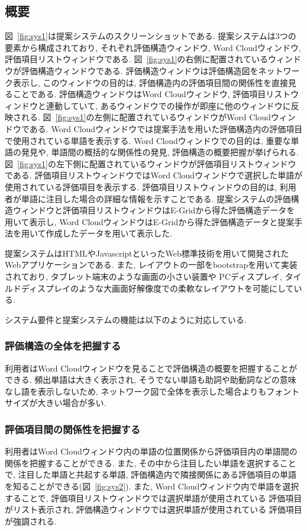 \documentclass[syuuron]{kuee}
\begin{document}
		\subsection{概要}
			図~\ref{fig:sys1}は提案システムのスクリーンショットである. 
			提案システムは3つの要素から構成されており, それぞれ評価構造ウィンドウ, Word Cloudウィンドウ, 評価項目リストウィンドウである. 
			図~\ref{fig:sys1}の右側に配置されているウィンドウが評価構造ウィンドウである. 
			評価構造ウィンドウは評価構造図をネットワーク表示し, このウィンドウの目的は, 評価構造内の評価項目間の関係性を直接見ることである. 
			評価構造ウィンドウはWord Cloudウィンドウ, 評価項目リストウィンドウと連動していて, 
			あるウィンドウでの操作が即座に他のウィンドウに反映される. 
			図~\ref{fig:sys1}の左側に配置されているウィンドウがWord Cloudウィンドウである. 
			Word Cloudウィンドウでは提案手法を用いた評価構造内の評価項目で使用されている単語を表示する. 
			Word Cloudウィンドウでの目的は, 重要な単語の発見や, 単語間の概括的な関係性の発見, 評価構造の概要把握が挙げられる. 
			図~\ref{fig:sys1}の左下側に配置されているウィンドウが評価項目リストウィンドウである. 
			評価項目リストウィンドウではWord Cloudウィンドウで選択した単語が使用されている評価項目を表示する. 
			評価項目リストウィンドウの目的は, 利用者が単語に注目した場合の詳細な情報を示すことである. 
			提案システムの評価構造ウィンドウと評価項目リストウィンドウはE-Gridから得た評価構造データを用いて表示し, 
			Word CloudウィンドウはE-Gridから得た評価構造データと提案手法を用いて作成したデータを用いて表示した. 
			
			提案システムはHTMLやJavascriptといったWeb標準技術を用いて開発されたWebアプリケーションである. 
			また, レイアウトの一部をbootstrapを用いて実装されており, タブレット端末のような画面の小さい装置や
			PCディスプレイ, タイルドディスプレイのような大画面好解像度での柔軟なレイアウトを可能にしている. 
			
			システム要件と提案システムの機能は以下のように対応している. 
			\subsubsection{評価構造の全体を把握する}
				利用者はWord Cloudウィンドウを見ることで評価構造の概要を把握することができる. 
				頻出単語は大きく表示され, そうでない単語も助詞や助動詞などの意味なし語を表示しないため, 
				ネットワーク図で全体を表示した場合よりもフォントサイズが大きい場合が多い. 				
			\subsubsection{評価項目間の関係性を把握する}
				利用者はWord Cloudウィンドウ内の単語の位置関係から評価項目内の単語間の関係を把握することができる. 
				また, その中から注目したい単語を選択することで, 注目した単語と共起する単語, 
				評価構造内で隣接関係にある評価項目の単語を知ることができる(図~\ref{fig:sys2}). 
				また, Word Cloudウィンドウ内で単語を選択することで, 評価項目リストウィンドウでは選択単語が使用されている
				評価項目がリスト表示され, 評価構造ウィンドウでは選択単語が使用されている
				評価項目が強調される. 
\end{document}
